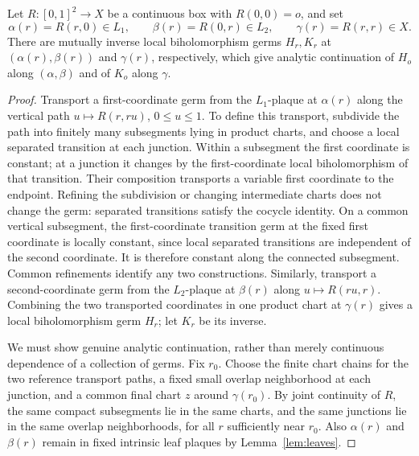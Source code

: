 \begin{proposition}\label{prop:germ-transport}
Let \(R:[0,1]^2\to X\) be a continuous box with \(R(0,0)=o\), and set
\[
 \alpha(r)=R(r,0)\in L_1,
 \qquad \beta(r)=R(0,r)\in L_2,
 \qquad \gamma(r)=R(r,r)\in X.
\]
There are mutually inverse local biholomorphism germs \(H_r,K_r\)
at \((\alpha(r),\beta(r))\) and \(\gamma(r)\), respectively,
which give analytic continuation of \(H_o\) along \((\alpha,\beta)\)
and of \(K_o\) along \(\gamma\).
\end{proposition}

\begin{proof}
Transport a first-coordinate germ from the \(L_1\)-plaque at
\(\alpha(r)\) along the vertical path
\(u\mapsto R(r,ru)\), \(0\leq u\leq1\). To define this transport,
subdivide the path into finitely many subsegments lying in product
charts, and choose a local separated transition at each junction.
Within a subsegment the first coordinate is constant; at a junction it
changes by the first-coordinate local biholomorphism of that transition.
Their composition transports a variable first coordinate to the
endpoint. Refining the subdivision or changing intermediate charts
does not change the germ: separated transitions satisfy the cocycle
identity. On a common vertical subsegment, the first-coordinate transition
germ at the fixed first coordinate is locally constant, since local
separated transitions are independent of the second coordinate. It is
therefore constant along the connected subsegment. Common refinements identify any two
constructions. Similarly, transport a second-coordinate germ from the
\(L_2\)-plaque at \(\beta(r)\) along
\(u\mapsto R(ru,r)\). Combining the two transported coordinates in
one product chart at \(\gamma(r)\) gives a local biholomorphism germ
\(H_r\); let \(K_r\) be its inverse.

We must show genuine analytic continuation, rather than merely
continuous dependence of a collection of germs. Fix \(r_0\). Choose
the finite chart chains for the two reference transport paths, a fixed
small overlap neighborhood at each junction, and a common final chart
\(z\) around \(\gamma(r_0)\). By joint continuity of \(R\), the
same compact subsegments lie in the same charts, and the same junctions
lie in the same overlap neighborhoods, for all \(r\) sufficiently
near \(r_0\). Also \(\alpha(r)\) and \(\beta(r)\) remain in
fixed intrinsic leaf plaques by Lemma~\ref{lem:leaves}.


\end{proof}
